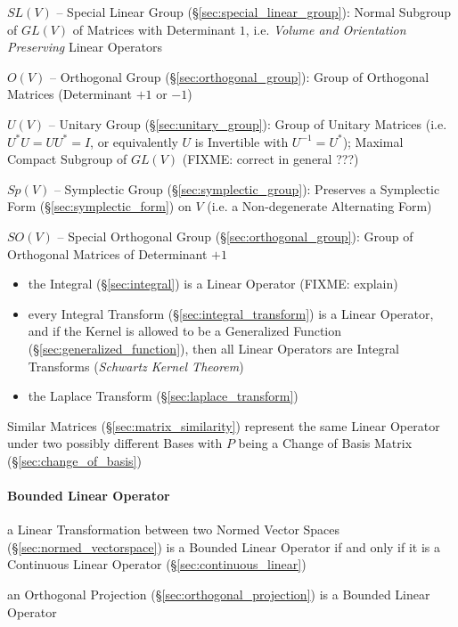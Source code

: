 $SL(V)$ -- Special Linear Group (\S\ref{sec:special_linear_group}): Normal
Subgroup of $GL(V)$ of Matrices with Determinant $1$, i.e. \emph{Volume and
  Orientation Preserving} Linear Operators

$O(V)$ -- Orthogonal Group (\S\ref{sec:orthogonal_group}): Group of Orthogonal
Matrices (Determinant $+1$ or $-1$)

$U(V)$ -- Unitary Group (\S\ref{sec:unitary_group}): Group of Unitary Matrices
(i.e. $U^*U = UU^* = I$, or equivalently $U$ is Invertible with $U^{-1} =
U^*$); Maximal Compact Subgroup of $GL(V)$ (FIXME: correct in general ???)

$Sp(V)$ -- Symplectic Group (\S\ref{sec:symplectic_group}): Preserves a
Symplectic Form (\S\ref{sec:symplectic_form}) on $V$ (i.e. a Non-degenerate
Alternating Form)

$SO(V)$ -- Special Orthogonal Group (\S\ref{sec:orthogonal_group}): Group of
Orthogonal Matrices of Determinant $+1$

\begin{itemize}
  \item the Integral (\S\ref{sec:integral}) is a Linear Operator (FIXME:
    explain)
  \item every Integral Transform (\S\ref{sec:integral_transform}) is a Linear
    Operator, and if the Kernel is allowed to be a Generalized Function
    (\S\ref{sec:generalized_function}), then all Linear Operators are Integral
    Transforms (\emph{Schwartz Kernel Theorem})
  \item the Laplace Transform (\S\ref{sec:laplace_transform})
\end{itemize}

Similar Matrices (\S\ref{sec:matrix_similarity}) represent the same Linear
Operator under two possibly different Bases with $P$ being a Change of Basis
Matrix (\S\ref{sec:change_of_basis})



\paragraph{Bounded Linear Operator}\label{sec:bounded_linear_operator}

a Linear Transformation between two Normed Vector Spaces
(\S\ref{sec:normed_vectorspace}) is a Bounded Linear Operator if and
only if it is a Continuous Linear Operator
(\S\ref{sec:continuous_linear})

an Orthogonal Projection (\S\ref{sec:orthogonal_projection}) is a Bounded
Linear Operator

